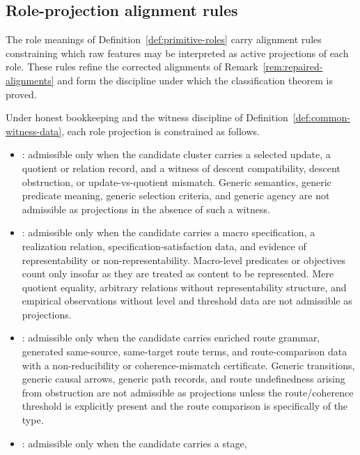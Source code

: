\subsection{Role-projection alignment rules}\label{subsec:alignment-rules}

The role meanings of Definition~\ref{def:primitive-roles} carry
alignment rules constraining which raw features may be interpreted as
active projections of each role. These rules refine the corrected
alignments of Remark~\ref{rem:repaired-alignments} and form the
discipline under which the classification theorem is proved.

\begin{proposition}\label{prop:alignment-rules}
Under honest bookkeeping and the witness discipline of
Definition~\ref{def:common-witness-data}, each role projection is
constrained as follows.
\begin{itemize}[topsep=2pt,itemsep=1pt]
  \item \Pone{}: admissible only when the candidate cluster carries a
    selected update, a quotient or relation record, and a witness of
    descent compatibility, descent obstruction, or update-vs-quotient
    mismatch. Generic semantics, generic predicate meaning, generic
    selection criteria, and generic agency are not admissible as
    \Pone{} projections in the absence of such a witness.
  \item \Ptwo{}: admissible only when the candidate carries a macro
    specification, a realization relation, specification-satisfaction
    data, and evidence of representability or non-representability.
    Macro-level predicates or objectives count only insofar as they are
    treated as content to be represented. Mere quotient equality,
    arbitrary relations without representability structure, and
    empirical observations without level and threshold data are not
    admissible as \Ptwo{} projections.
  \item \Pthree{}: admissible only when the candidate carries enriched
    route grammar, generated same-source, same-target route terms, and
    route-comparison data with a non-reducibility or coherence-mismatch
    certificate. Generic transitions, generic causal arrows, generic
    path records, and route undefinedness arising from \Pone{}
    obstruction are not admissible as \Pthree{} projections unless the
    route/coherence threshold is explicitly present and the route
    comparison is specifically of the \Pthree{} type.
  \item \Pfour{}: admissible only when the candidate carries a stage,

\end{itemize}
\end{proposition}
